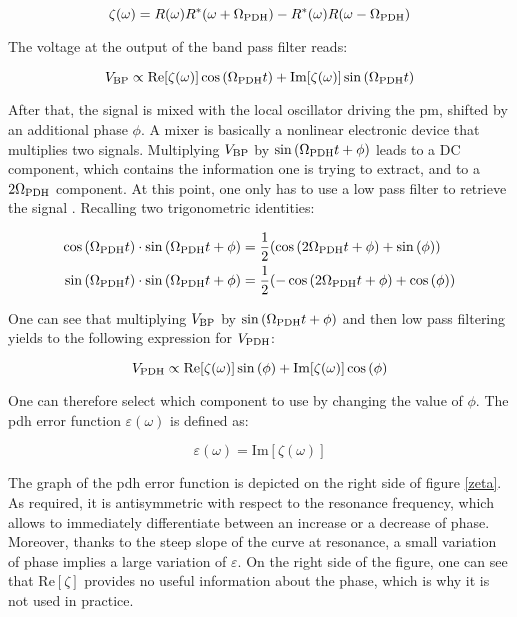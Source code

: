 \begin{equation}
	\zeta(\omega) = R(\omega)R^*(\omega+\Omega_{\text{PDH}})-R^*(\omega)R(\omega-\Omega_{\text{PDH}})
\end{equation}

The voltage at the output of the band pass filter reads:

\begin{equation}
	V_{\text{BP}} \propto \text{Re}[\zeta(\omega)]\cos{(\Omega_{\text{PDH}}t)} + \text{Im}[\zeta(\omega)] \sin{(\Omega_{\text{PDH}}t)}
\end{equation}

After that, the signal is mixed with the local oscillator driving the \gls{pm}, shifted by an additional phase $\phi$. A mixer is basically a nonlinear electronic device that multiplies two signals. Multiplying $V_{\text{BP}}$ by $\sin{(\Omega_{\text{PDH}}t+\phi)}$ leads to a DC component, which contains the information one is trying to extract, and to a $2\Omega_{\text{PDH}}$ component. At this point, one only has to use a low pass filter to retrieve the signal \cite{nickersonreview}. Recalling two trigonometric identities:

\begin{align}
	\cos{(\Omega_{\text{PDH}}t)}\cdot \sin{(\Omega_{\text{PDH}}t+\phi)} &= \frac{1}{2} (\cos{(2\Omega_{\text{PDH}}t+\phi)}+\sin{(\phi)})  \\
	\sin{(\Omega_{\text{PDH}}t)}\cdot \sin{(\Omega_{\text{PDH}}t+\phi)} &= \frac{1}{2} (-\cos{(2\Omega_{\text{PDH}}t+\phi)}+\cos{(\phi)}) 
\end{align}

One can see that multiplying $V_{\text{BP}}$ by $\sin{(\Omega_{\text{PDH}}t+\phi)}$ and then low pass filtering yields to the following expression for $V_{\text{PDH}}$:

\begin{equation}
	V_{\text{PDH}} \propto \text{Re}[\zeta(\omega)]\sin{(\phi)} + \text{Im}[\zeta(\omega)]\cos{(\phi)}
\end{equation}

One can therefore select which component to use by changing the value of $\phi$. The \gls{pdh} error function $\varepsilon(\omega)$ is defined as:

\begin{equation}
	\varepsilon(\omega) = \text{Im}[\zeta(\omega)]
\end{equation}

The graph of the \gls{pdh} error function is depicted on the right side of figure \ref{zeta}. As required, it is antisymmetric with respect to the resonance frequency, which allows to immediately differentiate between an increase or a decrease of phase. Moreover, thanks to the steep slope of the curve at resonance, a small variation of phase implies a large variation of $\varepsilon$. On the right side of the figure, one can see that $\text{Re}[\zeta]$ provides no useful information about the phase, which is why it is not used in practice.\\

